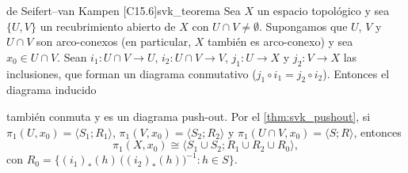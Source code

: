 \begin{teorema}{de Seifert--van Kampen [C15.6]}{svk_teorema}
Sea $X$ un espacio topológico y sea $\{U, V\}$ un recubrimiento abierto de $X$ con $U \cap V \neq \emptyset$. Supongamos que $U$, $V$ y $U \cap V$ son arco-conexos (en particular, $X$ también es arco-conexo) y sea $x_0 \in U \cap V$. Sean $i_1 \colon U \cap V \to U$, $i_2 \colon U \cap V \to V$, $j_1 \colon U \to X$ y $j_2 \colon V \to X$ las inclusiones, que forman un diagrama conmutativo ($j_1 \circ i_1 = j_2 \circ i_2$). Entonces el diagrama inducido
\begin{center}
\end{center}
también conmuta y es un diagrama push-out. Por el \cref{thm:svk_pushout}, si $\pi_1(U,x_0) = \langle S_1 ; R_1 \rangle$, $\pi_1(V,x_0) = \langle S_2 ; R_2 \rangle$ y $\pi_1(U \cap V, x_0) = \langle S ; R \rangle$, entonces
\[ \pi_1(X, x_0) \cong \langle S_1 \cup S_2 ; R_1 \cup R_2 \cup R_0 \rangle, \]
con $R_0 = \{ (i_1)_*(h)\,\big((i_2)_*(h)\big)^{-1} : h \in S \}$.
\end{teorema}

